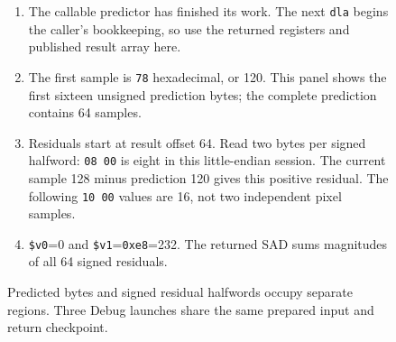 \begin{figure}[htbp]
  \par\smallskip
  \begin{minipage}{\linewidth}
    \small
    \begin{enumerate}
      \item The callable predictor has finished its work. The next \texttt{dla} begins the caller\textquoteright s bookkeeping, so use the returned registers and published result array here.
      \item The first sample is \texttt{78} hexadecimal, or 120. This panel shows the first sixteen unsigned prediction bytes; the complete prediction contains 64 samples.
      \item Residuals start at result offset 64. Read two bytes per signed halfword: \texttt{08 00} is eight in this little-endian session. The current sample 128 minus prediction 120 gives this positive residual. The following \texttt{10 00} values are 16, not two independent pixel samples.
      \item \texttt{\$v0}=0 and \texttt{\$v1}=\texttt{0xe8}=232. The returned SAD sums magnitudes of all 64 signed residuals.
    \end{enumerate}
  \end{minipage}
  \caption{Predicted bytes and signed residual halfwords occupy separate regions. Three Debug launches share the same prepared input and return checkpoint.}
  \label{fig:h263-prediction-residual}
\end{figure}
